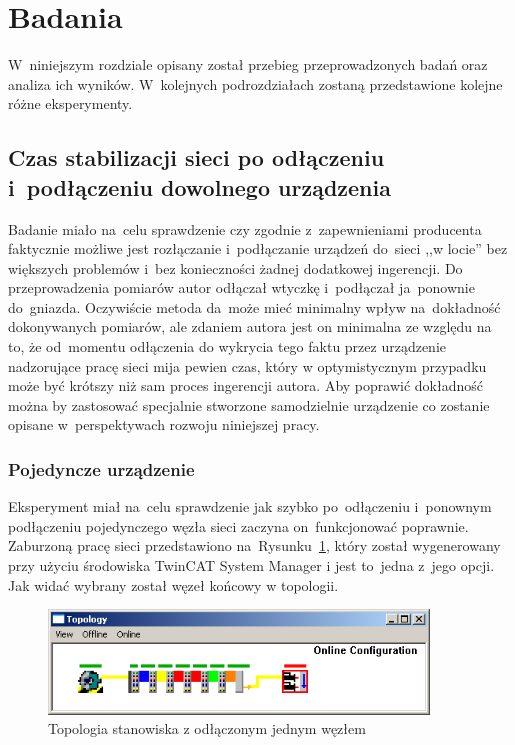 \section{Badania}
W~niniejszym rozdziale opisany został przebieg przeprowadzonych badań oraz analiza ich wyników. W~kolejnych podrozdziałach zostaną przedstawione kolejne różne eksperymenty. 

\subsection{Czas stabilizacji sieci po odłączeniu i~podłączeniu dowolnego urządzenia}
Badanie miało na~celu sprawdzenie czy zgodnie z~zapewnieniami producenta faktycznie możliwe jest rozłączanie i~podłączanie urządzeń do~sieci ,,w locie'' bez większych problemów i~bez konieczności żadnej dodatkowej ingerencji. Do przeprowadzenia pomiarów autor odłączał wtyczkę i~podłączał ja~ponownie do~gniazda. Oczywiście metoda da~może mieć minimalny wpływ na~dokładność dokonywanych pomiarów, ale zdaniem autora jest on minimalna ze względu na to, że od~momentu odłączenia do wykrycia tego faktu przez urządzenie nadzorujące pracę sieci mija pewien czas, który w optymistycznym przypadku może być krótszy niż sam proces ingerencji autora. Aby poprawić dokładność można by zastosować specjalnie stworzone samodzielnie urządzenie co zostanie opisane w~perspektywach rozwoju niniejszej pracy.

\subsubsection{Pojedyncze urządzenie}
Eksperyment miał na~celu sprawdzenie jak szybko po~odłączeniu i~ponownym podłączeniu pojedynczego węzła sieci zaczyna on~funkcjonować poprawnie. Zaburzoną pracę sieci przedstawiono na~Rysunku~\ref{one_slave}, który został wygenerowany przy użyciu środowiska TwinCAT System Manager i jest to~jedna z~jego opcji. Jak widać wybrany został węzeł końcowy w topologii.

\begin{figure}[!htb] 	\centering 	\includegraphics[width=0.9\textwidth]{images/topologyCXerror} \caption{Topologia stanowiska z odłączonym jednym węzłem} \label{one_slave} \end{figure}

